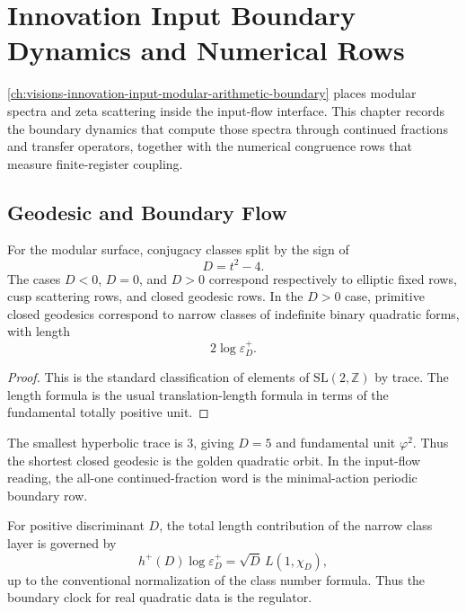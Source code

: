 \chapter{Innovation Input Boundary Dynamics and Numerical Rows}
\label{ch:visions-innovation-input-boundary-dynamics-numerics}

\autoref{ch:visions-innovation-input-modular-arithmetic-boundary} places
modular spectra and zeta scattering inside the input-flow interface. This
chapter records the boundary dynamics that compute those spectra through
continued fractions and transfer operators, together with the numerical
congruence rows that measure finite-register coupling.

\section{Geodesic and Boundary Flow}
\label{sec:innovation-input-boundary-geodesic-flow}

\begin{theorem}
\label{thm:innovation-input-boundary-discriminant-trichotomy}
For the modular surface, conjugacy classes split by the sign of
$$
D=t^2-4.
$$
The cases $D<0$, $D=0$, and $D>0$ correspond respectively to elliptic
fixed rows, cusp scattering rows, and closed geodesic rows. In the
$D>0$ case, primitive closed geodesics correspond to narrow classes of
indefinite binary quadratic forms, with length
$$
2\log\varepsilon_D^+.
$$
\end{theorem}

\begin{proof}
This is the standard classification of elements of
$\mathrm{SL}(2,\mathbb Z)$ by trace. The length formula is the usual
translation-length formula in terms of the fundamental totally positive
unit.
\end{proof}

\begin{principle}
\label{prin:innovation-input-boundary-golden-orbit}
The smallest hyperbolic trace is $3$, giving $D=5$ and fundamental unit
$\varphi^2$. Thus the shortest closed geodesic is the golden quadratic
orbit. In the input-flow reading, the all-one continued-fraction word is
the minimal-action periodic boundary row.
\end{principle}

\begin{theorem}
\label{thm:innovation-input-boundary-class-regulator-action}
For positive discriminant $D$, the total length contribution of the narrow
class layer is governed by
$$
h^+(D)\log\varepsilon_D^+
=
\sqrt D\,L(1,\chi_D),
$$
up to the conventional normalization of the class number formula. Thus the
boundary clock for real quadratic data is the regulator.
\end{theorem}


